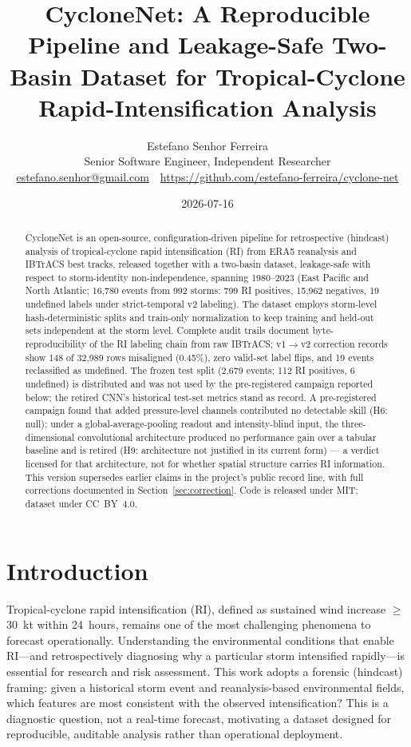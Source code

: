 \documentclass[11pt]{article}
\title{CycloneNet: A Reproducible Pipeline and Leakage-Safe Two-Basin
Dataset for Tropical-Cyclone Rapid-Intensification Analysis}
\author{Estefano Senhor Ferreira\\
\small Senior Software Engineer, Independent Researcher\\
\small \href{mailto:estefano.senhor@gmail.com}{estefano.senhor@gmail.com}
\,\textperiodcentered\,
\url{https://github.com/estefano-ferreira/cyclone-net}}
\date{2026-07-16}
\begin{document}
\maketitle

\begin{abstract}
\noindent CycloneNet is an open-source, configuration-driven pipeline for
retrospective (hindcast) analysis of tropical-cyclone rapid intensification
(RI) from ERA5 reanalysis and IBTrACS best tracks, released together with a
two-basin dataset, leakage-safe with respect to storm-identity
non-independence, spanning 1980--2023 (East Pacific and North
Atlantic; 16{,}780 events from 992 storms: 799 RI positives, 15{,}962
negatives, 19 undefined labels under strict-temporal v2 labeling). The
dataset employs storm-level hash-deterministic splits and train-only
normalization to keep training and held-out sets independent at the storm
level. Complete audit trails document byte-reproducibility of the RI
labeling chain from raw IBTrACS; v1$\to$v2 correction records show 148 of
32{,}989 rows misaligned (0.45\%), zero valid-set label flips, and 19 events
reclassified as undefined. The frozen test split (2{,}679 events; 112 RI
positives, 6 undefined) is distributed and was not used by the
pre-registered campaign reported below; the retired CNN's historical
test-set metrics stand as record. A pre-registered campaign found that added
pressure-level channels contributed no detectable skill (H6: null); under a
global-average-pooling readout and intensity-blind input, the
three-dimensional convolutional architecture produced no performance gain
over a tabular baseline and is retired (H9: architecture not justified in
its current form) --- a verdict licensed for that architecture, not for
whether spatial structure carries RI information. This version supersedes
earlier claims in the project's public record line, with full corrections
documented in Section~\ref{sec:correction}.
Code is released under MIT; dataset under CC~BY~4.0.
\end{abstract}

\section{Introduction}

Tropical-cyclone rapid intensification (RI), defined as sustained wind
increase $\geq$30~kt within 24~hours, remains one of the most challenging
phenomena to forecast operationally. Understanding the environmental
conditions that enable RI---and retrospectively diagnosing why a particular
storm intensified rapidly---is essential for research and risk assessment.
This work adopts a forensic (hindcast) framing: given a historical storm
event and reanalysis-based environmental fields, which features are most
consistent with the observed intensification? This is a diagnostic question,
not a real-time forecast, motivating a dataset designed for reproducible,
auditable analysis rather than operational deployment.
\end{document}
